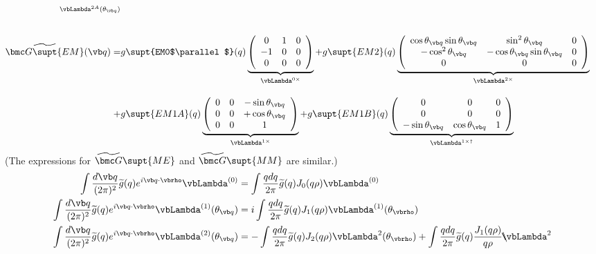 \documentclass[letterpaper]{article}
\renewcommand{\wt}{\widetilde}
\begin{document}
\begin{align*}
{               }_{\vbLambda^{2A}(\theta_{\vb q})}
\\[20pt]
 \wt{\bmc G\supt{EM}}(\vb q)
 = &g\supt{EM0$\parallel$}(q)
    \underbrace{ \left(\begin{array}{ccc}
                       0 & 1 & 0 \\ 
                      -1 & 0 & 0 \\ 
                       0 & 0 & 0 
                 \end{array}\right)
               }_{\vbLambda^{0\times}}
  +g\supt{EM2}(q)
   \underbrace{
   \left(\begin{array}{ccc}
    \cos\theta_{\vb q} \sin\theta_{\vb q} & \sin^2\theta_{\vb q} & 0 \\
    -\cos^2\theta_{\vb q} & -\cos\theta_{\vb q} \sin\theta_{\vb q} & 0 \\
    0                     & 0                    & 0 
   \end{array}\right)
              }_{\vbLambda^{2\times}}
\\[10pt]
  + &g\supt{EM1A}(q)
   \underbrace{
    \left(\begin{array}{ccc}
    0 & 0 & -\sin\theta_{\vb q} \\
    0 & 0 & +\cos\theta_{\vb q} \\
    0 & 0 & 1
   \end{array}\right)
              }_{\vbLambda^{1\times}}
  + g\supt{EM1B}(q)
   \underbrace{
    \left(\begin{array}{ccc}
    0 & 0 & 0 \\
    0 & 0 & 0 \\
   -\sin\theta_{\vb q} & \cos\theta_{\vb q} & 1
   \end{array}\right)
              }_{\vbLambda^{1\times\dagger}}
\end{align*}
(The expressions for $\wt{\bmc G}\supt{ME}$ and $\wt{\bmc G}\supt{MM}$ are
similar.)
\begin{align*}
 \int \frac{d \vb q}{(2\pi)^2} \wt g(q) e^{i\vb q \cdot \vbrho} \vbLambda^{(0)}
&=\int \frac{qdq}{2\pi} \wt g(q) J_0(q\rho) \vbLambda^{(0)}
\\
 \int \frac{d \vb q}{(2\pi)^2} \wt g(q) e^{i\vb q \cdot \vbrho} \vbLambda^{(1)}(\theta_{\vb q})
&=i\int \frac{qdq}{2\pi} \wt g(q) J_1(q\rho) \vbLambda^{(1)}(\theta_{\vbrho})
\\
 \int \frac{d \vb q}{(2\pi)^2} \wt g(q) e^{i\vb q \cdot \vbrho}
 \vbLambda^{(2)}(\theta_{\vb q})
&=-\int \frac{qdq}{2\pi} \wt g(q) J_2(q\rho) \vbLambda^2(\theta_{\vbrho})
  +\int \frac{qdq}{2\pi} \wt g(q) \frac{J_1(q\rho)}{q\rho}
   \backslash\hspace{-0.085in}\vbLambda^{2}
\end{align*}
\end{document}
